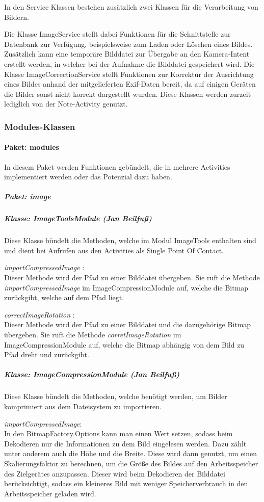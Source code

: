 In den Service Klassen bestehen zusätzlich zwei Klassen für die Verarbeitung von Bildern.

Die Klasse ImageService stellt dabei Funktionen für die Schnittstelle zur Datenbank zur Verfügung, beispielsweise zum Laden oder Löschen eines Bildes. Zusätzlich kann eine temporäre Bilddatei zur Übergabe an den Kamera-Intent erstellt werden, in welcher bei der Aufnahme die Bilddatei gespeichert wird. Die Klasse ImageCorrectionService stellt Funktionen zur Korrektur der Ausrichtung eines Bildes anhand der mitgelieferten Exif-Daten bereit, da auf einigen Geräten die Bilder sonst nicht korrekt dargestellt wurden. Diese Klassen werden zurzeit lediglich von der Note-Activity genutzt.

\subsubsection{Modules-Klassen}
\paragraph{Paket: modules}
In diesem Paket werden Funktionen gebündelt, die in mehrere Activities implementiert werden oder das Potenzial dazu haben. 
\subparagraph{Paket: image}

\subparagraph*{Klasse: ImageToolsModule (Jan Beilfuß)}
Diese Klasse bündelt die Methoden, welche im Modul ImageTools enthalten sind und dient bei Aufrufen aus den Activities als Single Point Of Contact.

\textit{ importCompressedImage }:\\
Dieser Methode wird der Pfad zu einer Bilddatei übergeben. Sie ruft die Methode \textit{importCompressedImage} im ImageCompressionModule auf, welche die Bitmap zurückgibt, welche auf dem Pfad liegt.

\textit{ correctImageRotation }:\\
Dieser Methode wird der Pfad zu einer Bilddatei und die dazugehörige Bitmap übergeben. Sie ruft die Methode \textit{corretImageRotation} im ImageCompressionModule auf, welche die Bitmap abhängig von dem Bild zu Pfad dreht und zurückgibt.

\subparagraph*{Klasse: ImageCompressionModule (Jan Beilfuß)}
Diese Klasse bündelt die Methoden, welche benötigt werden, um Bilder komprimiert aus dem Dateisystem zu importieren.

\textit{importCompressedImage}:\\
In den BitmapFactory.Options kann man einen Wert setzen, sodass beim Dekodieren nur die Informationen zu dem Bild eingelesen werden. Dazu zählt unter anderem auch die Höhe und die Breite. Diese wird dann genutzt, um einen Skalierungsfaktor zu berechnen, um die Größe des Bildes auf den Arbeitsspeicher des Zielgerätes anzupassen. Dieser wird beim Dekodieren der Bilddatei berücksichtigt, sodass ein kleineres Bild mit weniger Speicherverbrauch in den Arbeitsspeicher geladen wird.

